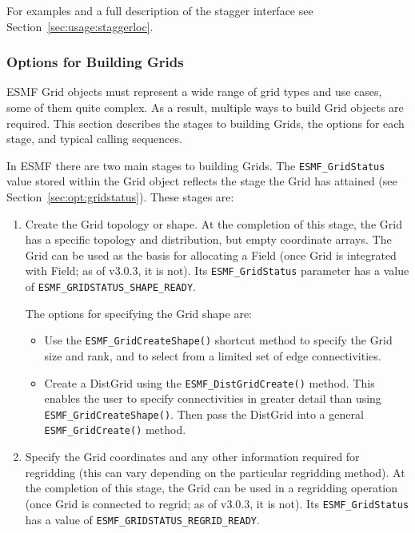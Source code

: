 For examples and a full description of the stagger interface 
see Section~\ref{sec:usage:staggerloc}. 

\subsubsection{Options for Building Grids}
\label{sec:gridcreateoptions}

ESMF Grid objects must represent a wide range of grid types 
and use cases, some of them quite complex.  As a result, multiple
ways to build Grid objects are required.  This section describes
the stages to building Grids, the options for each stage, and 
typical calling sequences.

In ESMF there are two main stages to building Grids.  The
{\tt ESMF\_GridStatus} value stored within the Grid object reflects
the stage the Grid has attained (see Section~\ref{sec:opt:gridstatus}).
These stages are:

\begin{enumerate}

\item Create the Grid topology or shape.  At the completion of this
stage, the Grid has a specific topology and distribution, but
empty coordinate arrays.  The Grid can be used as the basis for
allocating a Field (once Grid is integrated with Field; as of 
v3.0.3, it is not).  Its {\tt ESMF\_GridStatus} parameter has 
a value of {\tt ESMF\_GRIDSTATUS\_SHAPE\_READY}.  

The options for specifying the Grid shape are:
\begin{itemize}
\item Use the {\tt ESMF\_GridCreateShape()} shortcut method to 
specify the Grid size and rank, and to select from a limited set
of edge connectivities.   
\item Create a DistGrid using the {\tt ESMF\_DistGridCreate()}
method.  This enables the user to specify connectivities in 
greater detail than using {\tt ESMF\_GridCreateShape()}.  Then
pass the DistGrid into a general {\tt ESMF\_GridCreate()} method.
\end{itemize}

\item Specify the Grid coordinates and any other information
required for regridding (this can vary depending on the particular
regridding method).  At the completion of this stage, the Grid can
be used in a regridding operation (once Grid is connected to regrid;
as of v3.0.3, it is not).  Its {\tt ESMF\_GridStatus}
has a value of {\tt ESMF\_GRIDSTATUS\_REGRID\_READY}.
\end{enumerate}

